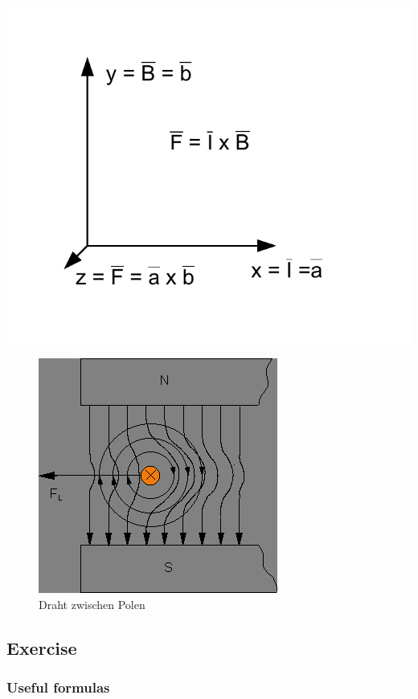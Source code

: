 \documentclass[a4paper]{scrartcl}
\begin{document}
\begin{center}
\includegraphics[scale=0.5]{images/kreuzprodukt.pdf}
\label{fig:kreuzprodukt}
\end{center}


\begin{figure}[h!]
\begin{center}
\includegraphics[scale=0.5]{images/DrahtZwischenPolen.png}
\caption{Draht zwischen Polen}
\label{fig:DrahtZwischenPolen}
\end{center}
\end{figure}


\subsection{Exercise}
\subsubsection{Useful formulas}
\end{document}
